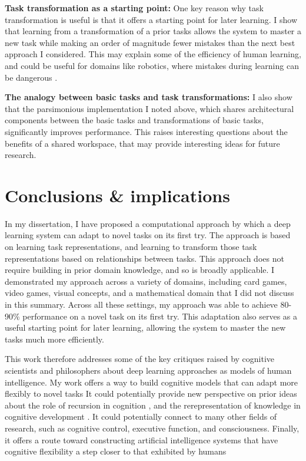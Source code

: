 \documentclass[12pt]{article}
\begin{document}
\textbf{Task transformation as a starting point:} One key reason why task transformation is useful is that it offers a starting point for later learning. I show that learning from a transformation of a prior tasks allows the system to master a new task while making an order of magnitude fewer mistakes than the next best approach I considered. This may explain some of the efficiency of human learning, and could be useful for domains like robotics, where mistakes during learning can be dangerous \citep{Turchetta2016}.  

\textbf{The analogy between basic tasks and task transformations:} I also show that the parsimonious implementation I noted above, which shares architectural components between the basic tasks and transformations of basic tasks, significantly improves performance. This raises interesting questions about the benefits of a shared workspace, that may provide interesting ideas for future research.

\section{Conclusions \& implications}

In my dissertation, I have proposed a computational approach by which a deep learning system can adapt to novel tasks on its first try. The approach is based on learning task representations, and learning to transform those task representations based on relationships between tasks. This approach does not require building in prior domain knowledge, and so is broadly applicable. I demonstrated my approach across a variety of domains, including card games, video games, visual concepts, and a mathematical domain that I did not discuss in this summary. Across all these settings, my approach was able to achieve 80-90\% performance on a novel task on its first try. This adaptation also serves as a useful starting point for later learning, allowing the system to master the new tasks much more efficiently. 

This work therefore addresses some of the key critiques raised by cognitive scientists and philosophers about deep learning approaches as models of human intelligence. My work offers a way to build cognitive models that can adapt more flexibly to novel tasks It could potentially provide new perspective on prior ideas about the role of recursion in cognition \citep{Fodor2008lot2}, and the rerepresentation of knowledge in cognitive development \citep{Karmiloff-Smith1986}. It could potentially connect to many other fields of research, such as cognitive control, executive function, and consciousness. Finally, it offers a route toward constructing artificial intelligence systems that have cognitive flexibility a step closer to that exhibited by humans 
\end{document}
